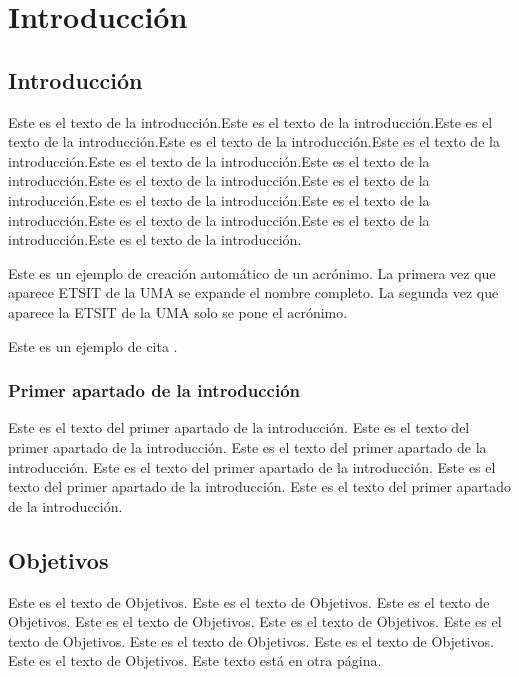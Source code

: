 \chapter{Introducción}  %
\section{Introducción} 

Este es el texto de la introducción.Este es el texto de la introducción.Este es el texto de la introducción.Este es el texto de la introducción.Este es el texto de la introducción.Este es el texto de la introducción.Este es el texto de la introducción.Este es el texto de la introducción.Este es el texto de la introducción.Este es el texto de la introducción.Este es el texto de la introducción.Este es el texto de la introducción.Este es el texto de la introducción.Este es el texto de la introducción.

Este es un ejemplo de creación automático de un acrónimo. La primera vez que aparece \ac{ETSIT} de la \ac{UMA} se expande el nombre completo. La segunda vez que aparece la \ac{ETSIT} de la \ac{UMA} solo se pone el acrónimo. 

Este es un ejemplo de cita \cite{Cover}.


\subsection{Primer apartado de la introducción}
Este es el texto del primer apartado de la introducción. Este es el texto del primer apartado de la introducción. Este es el texto del primer apartado de la introducción. Este es el texto del primer apartado de la introducción. Este es el texto del primer apartado de la introducción. Este es el texto del primer apartado de la introducción.


\section{Objetivos}
Este es el texto de Objetivos. Este es el texto de Objetivos. Este es el texto de Objetivos. Este es el texto de Objetivos. Este es el texto de Objetivos. Este es el texto de Objetivos. Este es el texto de Objetivos. Este es el texto de Objetivos. Este es el texto de Objetivos. 
\newpage
Este texto está en otra página. 
\newpage
\newpage

